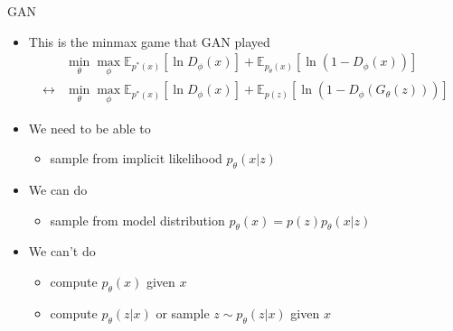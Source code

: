 \documentclass[compress]{beamer}
\newcommand{\expects}[2]{\mathbb{E}_{#1} \left[ #2 \right]}
\begin{document}
\begin{frame}[allowframebreaks]{GAN}
    \framebreak
    \begin{itemize}
        \item This is the minmax game that GAN played
            \begin{align*}
                & \mathop{min}_{\theta}\mathop{max}_{\phi} \expects{p^*(x)}{\ln D_{\phi}(x)} + \expects{p_{\theta}(x)}{\ln(1-D_{\phi}(x))} \\
                \leftrightarrow & \mathop{min}_{\theta}\mathop{max}_{\phi} \expects{p^*(x)}{\ln D_{\phi}(x)} + \expects{p(z)}{\ln(1-D_{\phi}(G_{\theta}(z)))}
            \end{align*}
        \item We need to be able to
            \begin{itemize}
                \item sample from implicit likelihood $p_\theta(x|z)$
            \end{itemize}
        \item We can do
            \begin{itemize}
                \item sample from model distribution $p_\theta(x)=p(z)p_\theta(x|z)$
            \end{itemize}
        \item We can't do
            \begin{itemize}
                \item compute $p_{\theta}(x)$ given $x$
                \item compute $p_{\theta}(z|x)$ or sample $z\sim p_{\theta}(z|x)$ given $x$
            \end{itemize}
    \end{itemize}
\end{frame}
\end{document}
